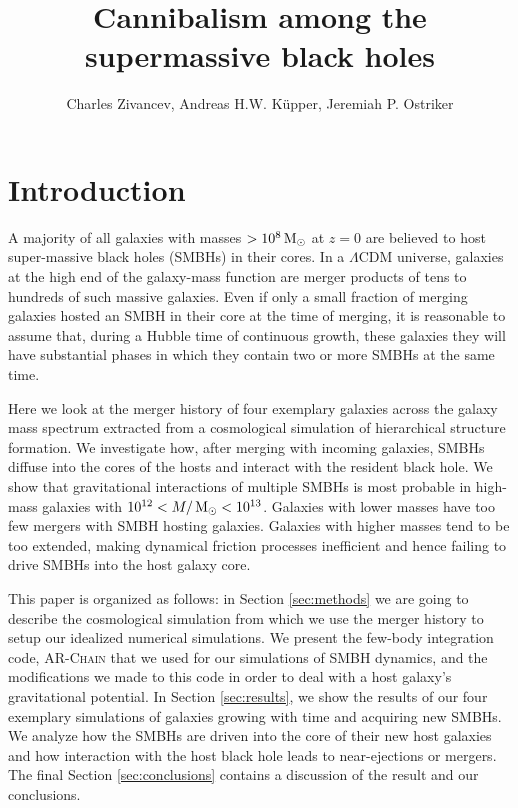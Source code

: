 \documentclass[english, apj]{emulateapj}
\newcommand{\msun}{\mbox{$\,{\rm M}_\odot$}}
\begin{document}
\title{Cannibalism among the supermassive black holes}


\author{Charles Zivancev, Andreas H.W. K\"upper, Jeremiah P. Ostriker}




\begin{abstract}

\end{abstract}






\section{Introduction}\label{sec:introduction}
A majority of all galaxies with masses $>10^8\msun$ at $z=0$ are believed to host super-massive black holes (SMBHs) in their cores. In a $\Lambda$CDM universe, galaxies at the high end of the galaxy-mass function are merger products of tens to hundreds of such massive galaxies. Even if only a small fraction of merging galaxies hosted an SMBH in their core at the time of merging, it is reasonable to assume that, during a Hubble time of continuous growth, these galaxies they will have substantial phases in which they contain two or more SMBHs at the same time. 

Here we look at the merger history of four exemplary galaxies across the galaxy mass spectrum extracted from a cosmological simulation of hierarchical structure formation. We investigate how, after merging with incoming galaxies, SMBHs diffuse into the cores of the hosts and interact with the resident black hole. We show that gravitational interactions of multiple SMBHs is most probable in high-mass galaxies with $10^{12}<M/\msun < 10^{13}$. Galaxies with lower masses  have too few mergers with SMBH hosting galaxies. Galaxies with higher masses tend to be too extended, making dynamical friction processes inefficient and hence failing to drive SMBHs into the host galaxy core.

This paper is organized as follows: in Section \ref{sec:methods} we are going to describe the cosmological simulation from which we use the merger history to setup our idealized numerical simulations. We present the few-body integration code, \textsc{AR-Chain} that we used for our simulations of SMBH dynamics, and the modifications we made to this code in order to deal with a host galaxy's gravitational potential. In Section \ref{sec:results}, we show the results of our four exemplary simulations of galaxies growing with time and acquiring new SMBHs. We analyze how the SMBHs are driven into the core of their new host galaxies and how interaction with the host black hole leads to near-ejections or mergers. The final Section \ref{sec:conclusions} contains a discussion of the result and our conclusions.
\end{document}
